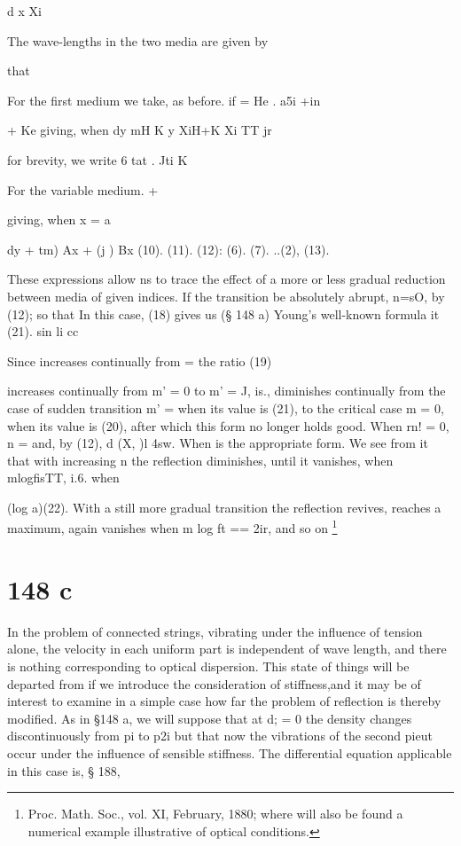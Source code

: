 d  x Xi

The wave-lengths in the two media are given by

that

For the first medium we take, as before. if = He . a5i  +in

+ Ke giving, when dy mH K y  XiH+K Xi TT jr

for brevity, we write 6 tat .  Jti K

For the variable medium. +

giving, when x = a

dy + tm) Ax + (j ) Bx (10).  (11). (12): (6).  (7). ..(2), (13).

These expressions allow ns to trace the effect of a more or less gradual
reduction between media of given indices. If the transition be
absolutely abrupt, n=sO, by (12); so that In this case, (18) gives us
(§ 148 a) Young's well-known formula it (21). sin li cc

Since increases continually from = the ratio (19)

increases continually from m' = 0 to m' = J, is., diminishes continually
from the case of sudden transition m' = when its value is (21), to the
critical case m = 0, when its value is (20), after which this form no
longer holds good. When rn! = 0, n = and, by (12), d (X,  )l 4sw. When
is the appropriate form. We see from it that with increasing n the
reflection diminishes, until it vanishes, when mlogfisTT, i.6. when

(log a)(22). With a still more gradual transition the reflection
revives, reaches a maximum, again vanishes when m log ft == 2ir, and so
on \footnote{Proc. Math. Soc., vol. XI, February, 1880; where will also be found a
numerical example illustrative of optical conditions.}

\section{148 c}\label{sect:148c}

In the problem of connected strings, vibrating under the influence of
tension alone, the velocity in each uniform part is independent of wave
length, and there is nothing corresponding to optical dispersion. This
state of things will be departed from if we introduce the consideration
of stiffness,and it may be of interest to examine in a simple case how
far the problem of reflection is thereby modified. As in §148 a, we will
suppose that at d; = 0 the density changes discontinuously from pi to
p2i but that now the vibrations of the second pieut occur under the
influence of sensible stiffness. The differential equation applicable in
this case is, § 188,

